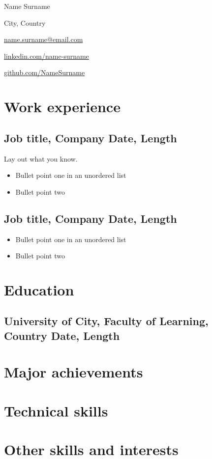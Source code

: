 \documentclass[a4paper]{article}
\begin{document}
\begin{multicols}{2}

\noindent
\begin{minipage}{.49\textwidth}
\raggedright

{\huge Name Surname}

City, Country
\end{minipage}

\noindent
\begin{minipage}{.49\textwidth}
\raggedleft

\href{mailto:name.surname@email.com}{name.surname@email.com}

\href{https://linkedin.com/in/name-surname}{linkedin.com/name-surname}

\href{https://github.com/NameSurname}{github.com/NameSurname}
\end{minipage}

\end{multicols}



\section{Work experience}
\subsection{Job title, Company \texorpdfstring{\hfill}{} Date, Length}
Lay out what you know.

\begin{itemize}
  \item Bullet point one in an unordered list
  \item Bullet point two
\end{itemize}

\subsection{Job title, Company \texorpdfstring{\hfill}{} Date, Length}

\begin{itemize}
  \item Bullet point one in an unordered list
  \item Bullet point two
\end{itemize}



\section{Education}
\subsection{University of City, Faculty of Learning, Country \texorpdfstring{\hfill}{} Date, Length}

\section{Major achievements}

\section{Technical skills}

\section{Other skills and interests}
\end{document}
